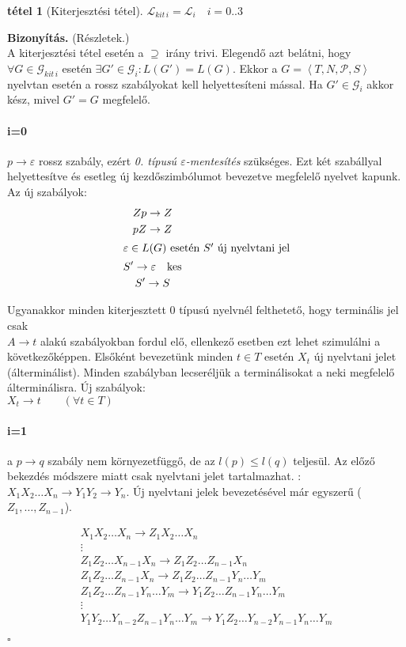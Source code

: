 \documentclass[fleqn,10pt,a4paper]{article}
\newcommand{\ob}{\hfill$\square$}
\renewcommand{\epsilon}{\varepsilon}
\theoremstyle{magyar}
\newtheorem{te}{tétel}[section]
\newenvironment{biz}{\begin{trivlist}\item\relax\mbox{\textbf{Bizonyítás.\enskip}}\ignorespaces}{\ob\end{trivlist}}
\newcommand{\Lang}{\mathcal{L}}
\newcommand{\Nytan}{\mathcal{G}}
\newcommand{\szabalyok}{\mathcal{P}}
\begin{document}
  \begin{te}[Kiterjesztési tétel] $\Lang_{kit\,i}=\Lang_i\quad i=0..3$
  \end{te}

  \begin{biz} (Részletek.)\\
    A kiterjesztési tétel esetén a $\supseteq$ irány trivi. Elegendő azt belátni, hogy $\forall  G\in\Nytan_{kit\,i}$
    esetén $\exists G'\in\Nytan_i\colon L(G') = L(G)$. Ekkor a $G=\left< T,N,\szabalyok,S\right>$ nyelvtan esetén a
    rossz szabályokat kell helyettesíteni mással. Ha $G'\in \Nytan_i$ akkor kész, mivel $G'=G$ megfelelő.
    
    \paragraph{i=0} $p\to \epsilon$ rossz szabály, ezért \emph{0. típusú $\epsilon$-mentesítés} szükséges. Ezt két
    szabállyal helyettesítve és esetleg új kezdőszimbólumot bevezetve megfelelő nyelvet kapunk. Az új szabályok:
    \begin{gather*}
      Zp\to Z\\
      pZ\to Z\\
      \intertext{$\epsilon\in L(G)$ esetén $S'$ új nyelvtani jel}
      S'\to\epsilon\quad\text{kes}\\
      S'\to S 
    \end{gather*}

    
    Ugyanakkor minden kiterjesztett 0 típusú nyelvnél felthetető, hogy terminális jel csak\\ $A\to t$ alakú szabályokban
    fordul elő, ellenkező esetben ezt lehet szimulálni a következőképpen. Elsőként bevezetünk minden $t\in T$ esetén
    $X_t$ új nyelvtani jelet (álterminálist). Minden szabályban lecseréljük a terminálisokat a neki megfelelő
    álterminálisra. Új szabályok:\\ $X_t\to t\qquad (\forall t\in T)$

    \paragraph{i=1} a $p\to q$ szabály nem környezetfüggő, de az $l(p)\leq l(q)$ teljesül. Az előző bekezdés módszere miatt csak
    nyelvtani jelet tartalmazhat. : $X_1 X_2\ldots X_n\to Y_1 Y_2\to Y_n$. Új nyelvtani jelek bevezetésével már egyszerű
    ($Z_1,\ldots,Z_{n-1}$).
    
    \begin{gather*}
      X_1 X_2\ldots X_n \to Z_1 X_2\ldots X_n\\
      \vdots\\
      Z_1 Z_2\ldots X_{n-1} X_n \to Z_1 Z_2 \ldots Z_{n-1} X_n\\
      Z_1 Z_2 \ldots Z_{n-1} X_n \to Z_1 Z_2 \ldots Z_{n-1} Y_n \ldots Y_m\\
      Z_1 Z_2 \ldots Z_{n-1} Y_n\ldots Y_m \to Y_1 Z_2 \ldots Z_{n-1} Y_n \ldots Y_m\\
      \vdots\\
      Y_1 Y_2 \ldots Y_{n-2} Z_{n-1} Y_n\ldots Y_m \to Y_1 Z_2 \ldots Y_{n-2} Y_{n-1}Y_n \ldots Y_m     
    \end{gather*}


\end{biz}
\end{document}
